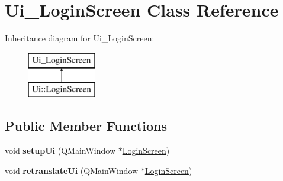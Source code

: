 \hypertarget{class_ui___login_screen}{}\section{Ui\+\_\+\+Login\+Screen Class Reference}
\label{class_ui___login_screen}
Inheritance diagram for Ui\+\_\+\+Login\+Screen\+:\begin{figure}[H]
\begin{center}
\leavevmode
\includegraphics[height=2.000000cm]{class_ui___login_screen}
\end{center}
\end{figure}
\subsection*{Public Member Functions}
\begin{DoxyCompactItemize}
\item 
\mbox{\label{class_ui___login_screen_a7ee8dae8b1e23e9bc066986d70b4e777}} 
void {\bfseries setup\+Ui} (Q\+Main\+Window $\ast$\hyperlink{class_login_screen}{Login\+Screen})
\item 
\mbox{\label{class_ui___login_screen_a7eaabd72044e6593d91fed48e64ef8ee}} 
void {\bfseries retranslate\+Ui} (Q\+Main\+Window $\ast$\hyperlink{class_login_screen}{Login\+Screen})
\end{DoxyCompactItemize}
